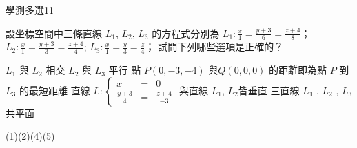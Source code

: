     \begin{QUESTION}
        \begin{ExamInfo}{97}{學測}{多選}{11}
        \end{ExamInfo}
        \begin{ExamAnsRateInfo}{27}{51}{19}{11}
        \end{ExamAnsRateInfo}
        \begin{QBODY}
            設坐標空間中三條直線 $L_1$, $L_2$, $L_3$ 的方程式分別為 $L_1: \frac{x}{1} = \frac{y+3}{6} = \frac{z+4}{8}$；$L_2: \frac{x}{1} = \frac{y+3}{3} = \frac{z+4}{4}$; $L_3: \frac{x}{1} = \frac{y}{3} = \frac{z}{4}$；
			試問下列哪些選項是正確的？
			\begin{QOPS} 
				\QOP $L_1$ 與 $L_2$ 相交 
				\QOP $L_2$ 與 $L_3$ 平行 
				\QOP 點 $P(0,-3,-4)$ 與$Q(0,0,0)$ 的距離即為點 $P$ 到 $L_3$ 的最短距離 
				\QOP 直線 $L: \left\{ \begin{array}{rcl} x & = & 0 \\ \frac{y+3}{4} &=& \frac{z+4}{-3} \end{array} \right.$ 與直線 $L_{1}$, $L_{2}$皆垂直
				\QOP 三直線 $L_1$ , $L_2$ , $L_3$ 共平面 
			\end{QOPS}
        \end{QBODY}
        \begin{QFROMS}
        \end{QFROMS}
        \begin{QTAGS}\end{QTAGS}
        \begin{QANS}
            (1)(2)(4)(5)
        \end{QANS}
        \begin{QSOLLIST}
        \end{QSOLLIST}
        \begin{QEMPTYSPACE}
        \end{QEMPTYSPACE}
    \end{QUESTION}
